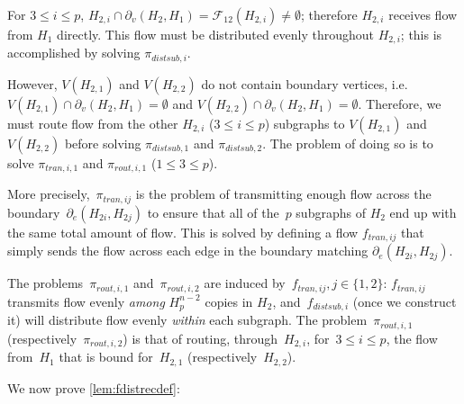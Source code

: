 \documentclass[
final
]{dmtcs-episciences}
\newcommand{\edgeh}[2]{\partial_e(#1,#2)}
\newcommand{\bdryh}[2]{\partial_v(#1,#2)}
\newcommand{\faceth}[1]{\mathcal{F}_{#1}}
\begin{document}
For $3 \leq i \leq p$, $H_{2,i} \cap \bdryh{H_2}{H_1} = \faceth{12}(H_{2,i}) \neq \emptyset$; therefore $H_{2,i}$ receives flow from $H_1$ directly. This flow must be distributed evenly throughout $H_{2,i}$; this is accomplished by solving $\pi_{distsub,i}$.

However, $V(H_{2,1})$ and $V(H_{2,2})$ do not contain boundary vertices, i.e. $V(H_{2,1}) \cap \bdryh{H_2}{H_1} = \emptyset$ and $V(H_{2,2}) \cap \bdryh{H_2}{H_1} = \emptyset$. Therefore, we must route flow from the other $H_{2,i}$ ($3 \leq i \leq p$) subgraphs to $V(H_{2,1})$ and $V(H_{2,2})$ before solving $\pi_{distsub,1}$ and $\pi_{distsub,2}$. The problem of doing so is to solve $\pi_{tran,i,1}$ and $\pi_{rout,i,1}$ ($1 \leq 3 \leq p$).

More precisely,~$\pi_{tran,ij}$ is the problem of transmitting enough flow across the boundary~$\edgeh{H_{2i}}{H_{2j}}$ to ensure that all of the~$p$ subgraphs of $H_2$ end up with the same total amount of flow. This is solved by defining a flow $f_{tran,ij}$ that simply sends the flow across each edge in the boundary matching $\edgeh{H_{2i}}{H_{2j}}$.

The problems~$\pi_{rout,i,1}$ and~$\pi_{rout,i,2}$ are induced by~$f_{tran,ij}, j \in \{1,2\}$: $f_{tran,ij}$ transmits flow evenly \emph{among} $H_p^{n-2}$ copies in $H_2$, and~$f_{distsub,i}$ (once we construct it) will distribute flow evenly \emph{within} each subgraph. The problem~$\pi_{rout,i,1}$ (respectively~$\pi_{rout,i,2}$) is that of routing, through~$H_{2,i}$, for~$3 \leq i \leq p$, the flow from~$H_1$ that is bound for~$H_{2,1}$ (respectively~$H_{2,2}$). 



We now prove \cref{lem:fdistrecdef}:
\end{document}
